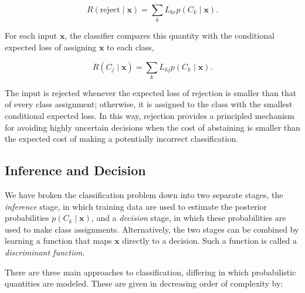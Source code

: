 \documentclass[10pt,twocolumn]{memoir}
\begin{document}
\begin{equation}
    R(\mathrm{reject}\mid\mathbf{x}) = \sum_k L_{kr}p(C_k\mid\mathbf{x}).
\end{equation}

For each input $\mathbf{x}$, the classifier compares this quantity with the conditional expected loss of assigning $\mathbf{x}$ to each class,

\begin{equation}
    R(C_j\mid\mathbf{x}) = \sum_k L_{kj}p(C_k\mid\mathbf{x}).
\end{equation}

The input is rejected whenever the expected loss of rejection is smaller than that of every class assignment; otherwise, it is assigned to the class with the smallest conditional expected loss. In this way, rejection provides a principled mechanism for avoiding highly uncertain decisions when the cost of abstaining is smaller than the expected cost of making a potentially incorrect classification.

\subsection{Inference and Decision}

We have broken the classiﬁcation problem down into two separate stages, the \textit{inference} stage, in which training data are used to estimate the posterior probabilities $p(C_k\mid\mathbf{x})$, and a \textit{decision} stage, in which these probabilities are used to make class assignments. Alternatively, the two stages can be combined by learning a function that maps $\mathbf{x}$ directly to a decision. Such a function is called a \textit{discriminant function}.

There are three main approaches to classification, differing in which probabilistic quantities are modeled. These are given in decreasing order of complexity by:
\end{document}
